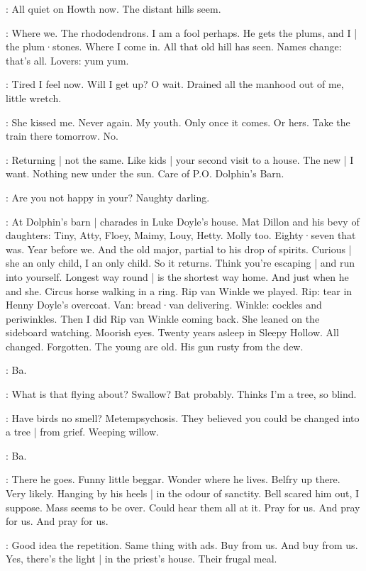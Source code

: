 \BloomCurrent:
All quiet on Howth now.
The distant hills seem.

\BloomHist:
Where we.
The rhododendrons.
I am a fool perhaps.
He gets the plums,
and I |
the plum·stones.
Where I come in.
All that old hill has seen.
Names change:
that's all.%
Lovers:
yum yum.

\BloomCurrent:
Tired I feel now.
Will I get up?
O wait.
Drained all the manhood out of me,
little wretch.

\BloomHist:
She kissed me.
Never again.
My youth.
Only once it comes.
Or hers.
Take the train there tomorrow.
No.

\BloomAbstract:
Returning |
not the same.
Like kids |
your second visit to a house.
The new |
I want.
Nothing new under the sun.
Care of P.O. Dolphin's Barn.

\BloomToday:
Are you not happy in your?
Naughty darling.

\BloomHist:
At Dolphin's barn |
charades in Luke Doyle's house.
Mat Dillon and his bevy of daughters:
Tiny,
Atty,
Floey,
Maimy,
Louy,
Hetty.
Molly too.
Eighty·seven that was.
Year before we.
And the old major,
partial to his drop of spirits.
Curious |
she an only child,
I an only child.
So it returns.
Think you're escaping |
and run into yourself.%
Longest way round |
is the shortest way home.
And just when he and she.
Circus horse
walking in a ring.
Rip van Winkle
we played.
Rip: tear in Henny Doyle's overcoat.
Van: bread·van delivering.
Winkle: cockles and periwinkles.
Then I did Rip van Winkle coming back.
She leaned on the sideboard watching.
Moorish eyes.
Twenty years asleep in Sleepy Hollow.
All changed.
Forgotten.
The young are old.
His gun rusty from the dew.

\bat:
Ba.

\BloomCurrent:
What is that flying about?
Swallow?
Bat probably.
Thinks I'm a tree,
so blind.

\BloomAbstract:
Have birds
no smell?
Metempsychosis.
They believed
you could be changed into a tree |
from grief.
Weeping willow.

\bat:
Ba.

\BloomCurrent:
There he goes.
Funny little beggar.
Wonder where he lives.%
Belfry up there.
Very likely.
Hanging by his heels |
in the odour of sanctity.
Bell scared him out,
I suppose.
Mass seems to be over.
Could hear them all at it.
Pray for us.
And pray for us.
And pray for us.

\BloomAbstract:
Good idea the repetition.
Same thing with ads.
Buy from us.
And buy from us.
Yes,
there's the light |
in the priest's house.
Their frugal meal.


